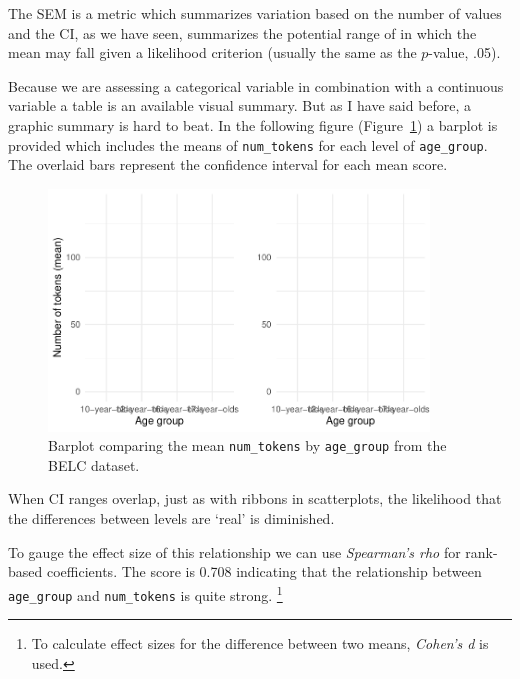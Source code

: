 \documentclass[
  letterpaper,
]{latex/krantz}
\begin{document}
The SEM is a metric which summarizes variation based on the number of
values and the CI, as we have seen, summarizes the potential range of in
which the mean may fall given a likelihood criterion (usually the same
as the \(p\)-value, .05).

Because we are assessing a categorical variable in combination with a
continuous variable a table is an available visual summary. But as I
have said before, a graphic summary is hard to beat. In the following
figure (Figure~\ref{fig-summaries-bivariate-barplot-belc}) a barplot is
provided which includes the means of \texttt{num\_tokens} for each level
of \texttt{age\_group}. The overlaid bars represent the confidence
interval for each mean score.

\begin{figure}[h]

{\centering \includegraphics[width=0.9\textwidth,height=\textheight]{./approaching-analysis_files/figure-pdf/fig-summaries-bivariate-barplot-belc-1.pdf}

}

\caption{\label{fig-summaries-bivariate-barplot-belc}Barplot comparing
the mean \texttt{num\_tokens} by \texttt{age\_group} from the BELC
dataset.}

\end{figure}

When CI ranges overlap, just as with ribbons in scatterplots, the
likelihood that the differences between levels are `real' is diminished.

To gauge the effect size of this relationship we can use
\emph{Spearman's rho} for rank-based coefficients. The score is 0.708
indicating that the relationship between \texttt{age\_group} and
\texttt{num\_tokens} is quite strong. \footnote{To calculate effect
  sizes for the difference between two means, \emph{Cohen's d} is used.}
\end{document}
